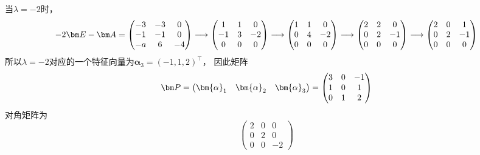 \begin{solution}
    当$\lambda=-2$时，
    \[
        -2\mat{E}-\mat{A} =
        \begin{pmatrix}
            -3 & -3 & 0  \\
            -1 & -1 & 0  \\
            -a & 6  & -4
        \end{pmatrix}
        \longrightarrow
        \begin{pmatrix}
            1  & 1 & 0  \\
            -1 & 3 & -2 \\
            0  & 0 & 0
        \end{pmatrix}
        \longrightarrow
        \begin{pmatrix}
            1 & 1 & 0  \\
            0 & 4 & -2 \\
            0 & 0 & 0
        \end{pmatrix}
        \longrightarrow
        \begin{pmatrix}
            2 & 2 & 0  \\
            0 & 2 & -1 \\
            0 & 0 & 0
        \end{pmatrix}
        \longrightarrow
        \begin{pmatrix}
            2 & 0 & 1  \\
            0 & 2 & -1 \\
            0 & 0 & 0
        \end{pmatrix}
    \]
    所以$\lambda=-2$对应的一个特征向量为$\bm{\alpha}_3 = (-1,1,2)^\intercal$，
    因此矩阵
    \[
        \mat{P} =
        \begin{pmatrix}
            \bm{\alpha}_1 & \bm{\alpha}_2 & \bm{\alpha}_3
        \end{pmatrix}
        =
        \begin{pmatrix}
            3 & 0 & -1 \\
            1 & 0 & 1  \\
            0 & 1 & 2
        \end{pmatrix}
    \]
    对角矩阵为
    \[
        \begin{pmatrix}
            2 & 0 & 0  \\
            0 & 2 & 0  \\
            0 & 0 & -2
        \end{pmatrix}
    \]
\end{solution}

